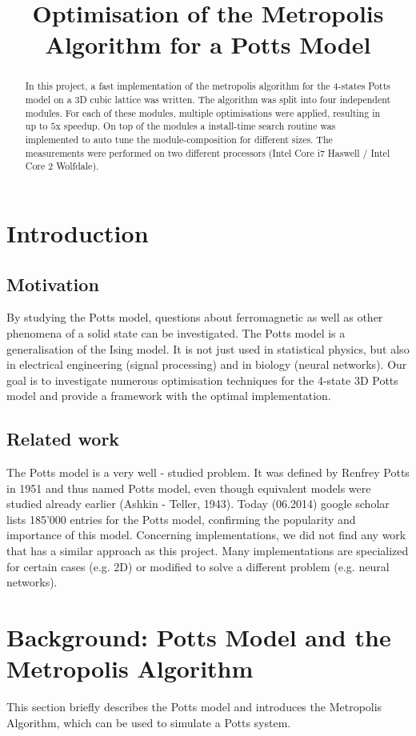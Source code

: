 \documentclass[letterpaper]{article}
\title{Optimisation of the Metropolis Algorithm for a Potts Model}
\begin{document}
%
\maketitle
%


\begin{abstract}
In this project, a fast implementation of the metropolis algorithm for the 4-states Potts model on a 3D cubic lattice was written. The algorithm was split into four independent modules. For each of these modules, multiple optimisations were applied, resulting in up to $5$x speedup. On top of the modules a install-time search routine was implemented to auto tune the module-composition for different sizes. The measurements were performed on two different processors (Intel Core i7 Haswell / Intel Core 2 Wolfdale). 
\end{abstract}

\section{Introduction}\label{sec:intro}
\subsection{Motivation} 
By studying the Potts model, questions about ferromagnetic as well as other phenomena of a solid state can be investigated. The Potts model is a generalisation of the Ising model. It is not just used in statistical physics, but also in electrical engineering (signal processing) and in biology (neural networks). Our goal is to investigate numerous optimisation techniques for the 4-state 3D Potts model and provide a framework with the optimal implementation. 
\subsection{Related work}
The Potts model is a very well - studied problem. It was defined by Renfrey Potts in 1951 and thus named Potts model, even though equivalent models were studied already earlier (Ashkin - Teller, 1943). Today (06.2014) google scholar lists 185'000 entries for the Potts model, confirming the popularity and importance of this model. Concerning implementations, we did not find any work that has a similar approach as this project. Many implementations are specialized for certain cases (e.g. 2D) or modified to solve a different problem (e.g. neural networks). 
\section{Background: Potts Model and the Metropolis Algorithm}\label{sec:background}
This section briefly describes the Potts model and introduces the Metropolis Algorithm, which can be used to simulate a Potts system.
\end{document}
